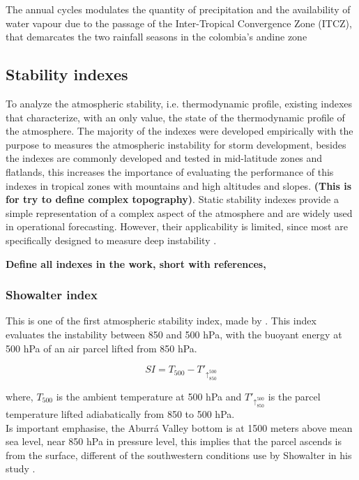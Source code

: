 \documentclass{ametsoc}
\begin{document}
The annual cycles modulates the quantity of precipitation and the availability of water vapour due to the passage of the Inter-Tropical Convergence Zone (ITCZ), that demarcates the two rainfall seasons in the colombia's andine zone 



\subsection{Stability indexes}

To analyze the atmospheric stability, i.e. thermodynamic profile, existing indexes that characterize, with an only value, the state of the thermodynamic profile of the atmosphere. The majority of the indexes were developed empirically with the purpose to measures the atmospheric instability for storm development, besides the indexes are commonly developed and tested in mid-latitude zones and flatlands, this increases the importance of evaluating the performance of this indexes in tropical zones with mountains and high altitudes and slopes. \textbf{(This is for try to define complex topography)}. Static stability indexes provide a simple representation of a complex aspect of the atmosphere and are widely used in operational forecasting. However, their applicability is limited, since most are specifically designed to measure deep instability \citep{henry2000static}.


\textbf{Define all indexes in the work, short with references, }

\subsubsection{Showalter index}
This is one of the first atmospheric stability index, made by \cite{showalter1953stability}. This index evaluates the instability between 850 and 500 hPa, with the buoyant energy at 500 hPa of an air parcel lifted from 850 hPa.


\begin{equation}
SI = T_{500} - T'_{\uparrow_{850}^{500} }
\label{eq:SI}
\end{equation}

where, $T_{500}$ is the ambient temperature at 500 hPa and $T'_{\uparrow_{850}^{500} }$ is the parcel temperature lifted adiabatically  from 850 to 500 hPa.\\
Is important emphasise, the Aburrá Valley bottom is at 1500 meters above mean sea level, near 850 hPa in pressure level, this implies that the parcel ascends is from the surface, different of the southwestern conditions use by Showalter in his study \citep{peppler1988review}.
\end{document}
